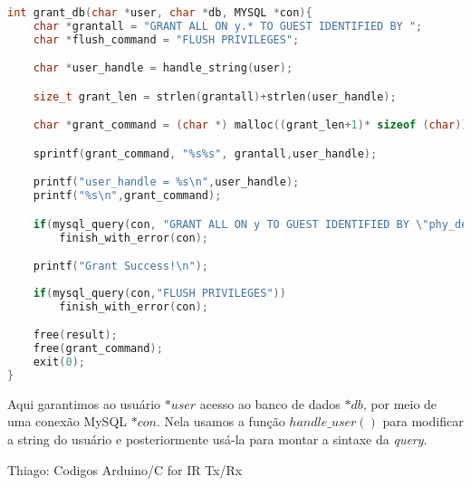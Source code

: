 \begin{lstlisting}[language=c, caption={fun\c{c}\~{a}o $grant\_db()$}, label={lst:dbphi8}]
int grant_db(char *user, char *db, MYSQL *con){
    char *grantall = "GRANT ALL ON y.* TO GUEST IDENTIFIED BY ";
	char *flush_command = "FLUSH PRIVILEGES";

	char *user_handle = handle_string(user);

	size_t grant_len = strlen(grantall)+strlen(user_handle);

	char *grant_command = (char *) malloc((grant_len+1)* sizeof (char));

	sprintf(grant_command, "%s%s", grantall,user_handle);

	printf("user_handle = %s\n",user_handle);
	printf("%s\n",grant_command);

	if(mysql_query(con, "GRANT ALL ON y TO GUEST IDENTIFIED BY \"phy_dev\""))
		finish_with_error(con);

	printf("Grant Success!\n");
	
	if(mysql_query(con,"FLUSH PRIVILEGES"))
		finish_with_error(con);

	free(result);
	free(grant_command);	
	exit(0);
}
\end{lstlisting}

Aqui garantimos ao usu\'{a}rio \textit{$*user$} acesso ao banco de dados \textit{$*db$}, por meio de uma conex\~{a}o 
MySQL \textit{$*con$}. Nela usamos a fun\c{c}\~{a}o \textit{$handle\_user()$} para modificar a string do usu\'{a}rio 
e posteriormente us\'{a}-la para montar a sintaxe da \textit{query}.

\begin{section}{Thiago: Codigos Arduino/C for IR Tx/Rx}
\end{section}
